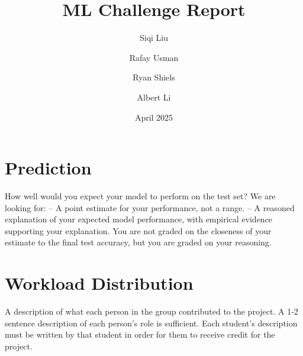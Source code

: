 \documentclass[journal]{IEEEtran}
\title{ML Challenge Report}
\author{
  Siqi Liu
  \and
  Rafay Usman
  \and
  Ryan Shiels
  \and
  Albert Li
}
\date{April 2025}
\begin{document}
\maketitle







\section{Prediction}
How well would you expect your model to perform on the test set? We are looking for:
– A point estimate for your performance, not a range.
– A reasoned explanation of your expected model performance, with empirical evidence supporting your explanation. You are not graded on the closeness of your estimate to the final test accuracy, but you are graded on your reasoning.

\section{Workload Distribution}
A description of what each person in the group contributed to the project. A 1-2 sentence description of each person’s role is sufficient. Each student’s description must be written by that
student in order for them to receive credit for the project.
\end{document}
